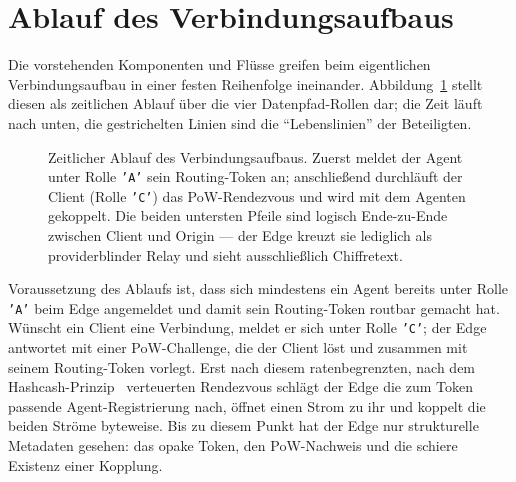 \section{Ablauf des Verbindungsaufbaus}
\label{sec:ablauf}

Die vorstehenden Komponenten und Flüsse greifen beim eigentlichen
Verbindungsaufbau in einer festen Reihenfolge ineinander.
Abbildung~\ref{fig:ablauf} stellt diesen als zeitlichen Ablauf über die vier
Datenpfad-Rollen dar; die Zeit läuft nach unten, die gestrichelten Linien sind
die \enquote{Lebenslinien} der Beteiligten.

\begin{figure}[t]
  \centering
  \caption{Zeitlicher Ablauf des Verbindungsaufbaus. Zuerst meldet der Agent
    unter Rolle \texttt{'A'} sein Routing-Token an; anschließend durchläuft der
    Client (Rolle \texttt{'C'}) das PoW-Rendezvous und wird mit dem Agenten
    gekoppelt. Die beiden untersten Pfeile sind logisch Ende-zu-Ende zwischen
    Client und Origin --- der Edge kreuzt sie lediglich als providerblinder
    Relay und sieht ausschließlich Chiffretext.}
  \label{fig:ablauf}
\end{figure}

Voraussetzung des Ablaufs ist, dass sich mindestens ein Agent bereits unter
Rolle \texttt{'A'} beim Edge angemeldet und damit sein Routing-Token routbar
gemacht hat. Wünscht ein Client eine Verbindung, meldet er sich unter Rolle
\texttt{'C'}; der Edge antwortet mit einer PoW-Challenge, die der Client löst und
zusammen mit seinem Routing-Token vorlegt. Erst nach diesem ratenbegrenzten,
nach dem Hashcash-Prinzip~\cite{back2002hashcash} verteuerten Rendezvous
schlägt der Edge die zum Token passende Agent-Registrierung nach, öffnet einen
Strom zu ihr und koppelt die beiden Ströme byteweise. Bis zu diesem Punkt hat
der Edge nur strukturelle Metadaten gesehen: das opake Token, den PoW-Nachweis
und die schiere Existenz einer Kopplung.

